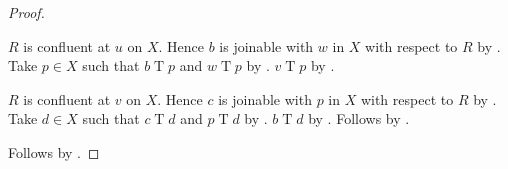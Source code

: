 \begin{proof}
\begin{subproof}
\begin{subproof}
            $R$ is confluent at $u$ on $X$.
            Hence $b$ is joinable with $w$ in $X$ with respect to $R$
                by .
            Take $p\in X$ such that $b\mathrel{T}p$ and $w\mathrel{T}p$
                by .
            $v\mathrel{T}p$ by .

            $R$ is confluent at $v$ on $X$.
            Hence $c$ is joinable with $p$ in $X$ with respect to $R$
                by .
            Take $d\in X$ such that $c\mathrel{T}d$ and $p\mathrel{T}d$
                by .
            $b\mathrel{T}d$ by .
            Follows by .
        \end{subproof}
    \end{subproof}
    Follows by .
\end{proof}

